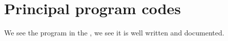 \chapter{Principal program codes}\label{ch:CODES}

\lstset{language=Python}

We see the program in the  , we see it is well written and documented.



